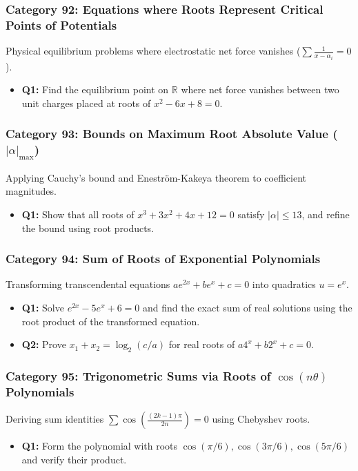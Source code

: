 \documentclass[10pt,a4paper]{article}
\begin{document}
\subsubsection{Category 92: Equations where Roots Represent Critical Points of Potentials}
Physical equilibrium problems where electrostatic net force vanishes ($\sum \frac{1}{x - \alpha_i} = 0$).
\begin{itemize}[leftmargin=*]
    \item \textbf{Q1:} Find the equilibrium point on $\mathbb{R}$ where net force vanishes between two unit charges placed at roots of $x^2 - 6x + 8 = 0$.
\end{itemize}

\subsubsection{Category 93: Bounds on Maximum Root Absolute Value ($|\alpha|_{\text{max}}$)}
Applying Cauchy's bound and Eneström-Kakeya theorem to coefficient magnitudes.
\begin{itemize}[leftmargin=*]
    \item \textbf{Q1:} Show that all roots of $x^3 + 3x^2 + 4x + 12 = 0$ satisfy $|\alpha| \le 13$, and refine the bound using root products.
\end{itemize}

\subsubsection{Category 94: Sum of Roots of Exponential Polynomials}
Transforming transcendental equations $a e^{2x} + b e^x + c = 0$ into quadratics $u = e^x$.
\begin{itemize}[leftmargin=*]
    \item \textbf{Q1:} Solve $e^{2x} - 5e^x + 6 = 0$ and find the exact sum of real solutions using the root product of the transformed equation.
    \item \textbf{Q2:} Prove $x_1 + x_2 = \log_2(c/a)$ for real roots of $a 4^x + b 2^x + c = 0$.
\end{itemize}

\subsubsection{Category 95: Trigonometric Sums via Roots of $\cos(n\theta)$ Polynomials}
Deriving sum identities $\sum \cos(\frac{(2k-1)\pi}{2n}) = 0$ using Chebyshev roots.
\begin{itemize}[leftmargin=*]
    \item \textbf{Q1:} Form the polynomial with roots $\cos(\pi/6), \cos(3\pi/6), \cos(5\pi/6)$ and verify their product.
\end{itemize}
\end{document}
